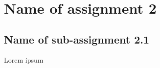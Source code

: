 \documentclass{article}
\begin{document}

\section{Name of assignment 2}
\subsection{Name of sub-assignment 2.1}
Lorem ipsum
\end{document}
